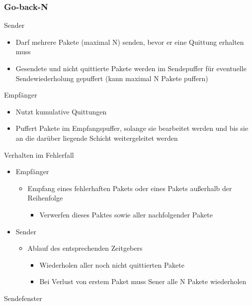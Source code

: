     \subsubsection{Go-back-N}
      Sender
      \begin{itemize}
        \item Darf mehrere Pakete (maximal N) senden, bevor er eine Quittung erhalten muss
        \item Gesendete und nicht quittierte Pakete werden im Sendepuffer für eventuelle
          Sendewiederholung gepuffert (kann maximal N Pakete puffern)
      \end{itemize}
      Empfänger
      \begin{itemize}
        \item Nutzt kumulative Quittungen
        \item Puffert Pakete im Empfangspuffer, solange sie bearbeitet werden und bis sie an die darüber
          liegende Schicht weitergeleitet werden
      \end{itemize}
      Verhalten im Fehlerfall
      \begin{itemize}
        \item Empfänger
          \begin{itemize}
            \item Empfang eines fehlerhaften Pakets oder eines Pakets außerhalb der Reihenfolge
              \begin{itemize}
                \item Verwerfen dieses Paktes sowie aller nachfolgender Pakete
              \end{itemize}
          \end{itemize}
        \item Sender
          \begin{itemize}
            \item Ablauf des entsprechenden Zeitgebers
              \begin{itemize}
                \item Wiederholen aller noch nicht quittierten Pakete
                \item Bei Verlust von erstem Paket muss Sener alle N Pakete wiederholen
              \end{itemize}
          \end{itemize}
      \end{itemize}
      Sendefenster
